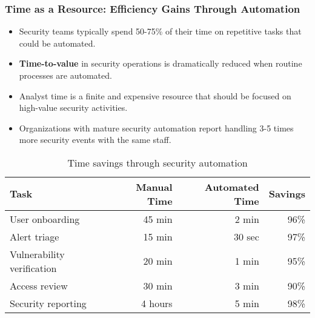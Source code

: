 \documentclass{beamer}
\begin{document}
\begin{frame}
  \frametitle{Time as a Resource: Efficiency Gains Through Automation}
  
  \begin{itemize}
    \item Security teams typically spend 50-75\% of their time on repetitive tasks that could be automated.
    \item \textbf{Time-to-value} in security operations is dramatically reduced when routine processes are automated.
    \item Analyst time is a finite and expensive resource that should be focused on high-value security activities.
    \item Organizations with mature security automation report handling 3-5 times more security events with the same staff.
  \end{itemize}
  
  \begin{table}
    \scriptsize
    \centering
    \begin{tabular}{|l|r|r|r|}
      \hline
      \textbf{Task} & \textbf{Manual Time} & \textbf{Automated Time} & \textbf{Savings} \\
      \hline
      User onboarding & 45 min & 2 min & 96\% \\
      Alert triage & 15 min & 30 sec & 97\% \\
      Vulnerability verification & 20 min & 1 min & 95\% \\
      Access review & 30 min & 3 min & 90\% \\
      Security reporting & 4 hours & 5 min & 98\% \\
      \hline
    \end{tabular}
    \caption{Time savings through security automation}
  \end{table}
\end{frame}
\end{document}
